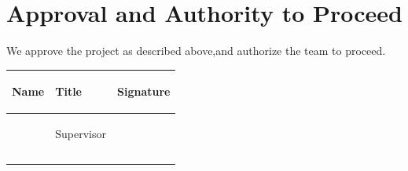 \documentclass{article}
\begin{document}
\section*{Approval and Authority to Proceed}

We approve the project as described above,and authorize the team to proceed.


\begin{center}
\begin{tabular}{ |p{9em}|p{9em}|p{9em}| }
    \hline
    \begin{center}\textbf{Name}\end{center} & \begin{center}\textbf{Title}\end{center} & \begin{center}\textbf{Signature}\end{center} \\
    \hline
    &\begin{center}{Supervisor}\end{center}&\\
    \hline
    &&\\
    &&\\
    \hline
\end{tabular}
\end{center}
\end{document}
